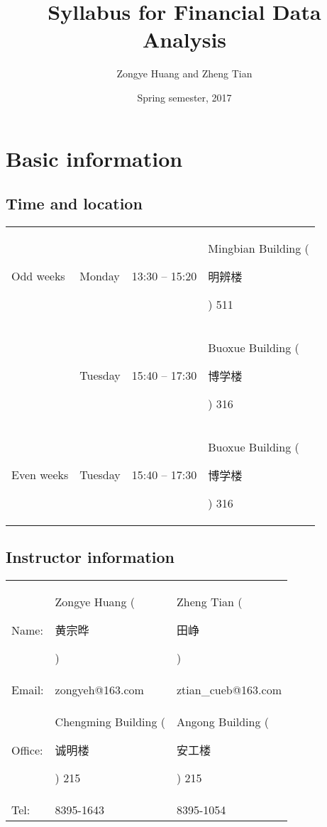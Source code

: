 \documentclass[a4paper,11pt]{article}
\author{Zongye Huang and Zheng Tian}
\date{Spring semester, 2017}
\title{Syllabus for Financial Data Analysis}
\begin{document}
\maketitle

\section{Basic information}
\label{sec:orgf095431}

\subsection*{Time and location}
\label{sec:orge153100}

\begin{center}
\begin{tabular}{llll}
Odd weeks & Monday & 13:30 -- 15:20 & Mingbian Building (\begin{CJK}{UTF8}{gbsn}明辨楼\end{CJK}) 511\\
 & Tuesday & 15:40 -- 17:30 & Buoxue Building (\begin{CJK}{UTF8}{gbsn}博学楼\end{CJK}) 316\\
Even weeks & Tuesday & 15:40 -- 17:30 & Buoxue Building (\begin{CJK}{UTF8}{gbsn}博学楼\end{CJK}) 316\\
\end{tabular}
\end{center}


\subsection*{Instructor information}
\label{sec:org9b994c1}

\begin{center}
\begin{tabular}{lll}
Name: & Zongye Huang (\begin{CJK}{UTF8}{gbsn}黄宗晔\end{CJK}) & Zheng Tian (\begin{CJK}{UTF8}{gbsn}田峥\end{CJK})\\
Email: & zongyeh@163.com & ztian\_cueb@163.com\\
Office: & Chengming Building (\begin{CJK}{UTF8}{gbsn}诚明楼\end{CJK}) 215 & Angong Building (\begin{CJK}{UTF8}{gbsn}安工楼\end{CJK}) 215\\
Tel: & 8395-1643 & 8395-1054\\
\end{tabular}
\end{center}
\end{document}
